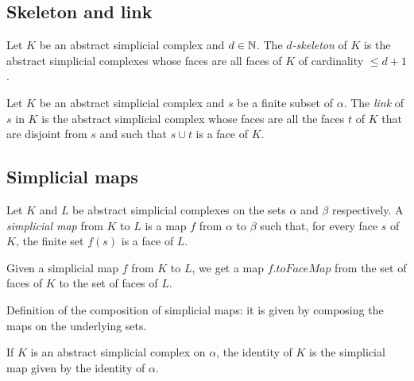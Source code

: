 \subsection{Skeleton and link}

\begin{subdefi}[skeleton]
Let $K$ be an abstract simplicial complex and $d\in\mathbb{N}$. The \emph{$d$-skeleton} of $K$ is the abstract simplicial complexes whose faces are
all faces of $K$ of cardinality $\leq d+1$.

\end{subdefi}

\begin{subdefi}[link]
Let $K$ be an abstract simplicial complex and $s$ be a finite subset of $\alpha$. The \emph{link} of $s$ in $K$ is the abstract simplicial complex
whose faces are all the faces $t$ of $K$ that are disjoint from $s$ and such that $s\cup t$ is a face of $K$.

\end{subdefi}


\subsection{Simplicial maps}

\begin{subdefi}[SimplicialMap]
Let $K$ and $L$ be abstract simplicial complexes on the sets $\alpha$ and $\beta$ respectively. A \emph{simplicial map} from $K$ to $L$ is a map
$f$ from $\alpha$ to $\beta$ such that, for every face $s$ of $K$, the finite set $f(s)$ is a face of $L$.

\end{subdefi}

\begin{subdefi}[toFaceMap]
Given a simplicial map $f$ from $K$ to $L$, we get a map $f.toFaceMap$ from the set of faces of $K$ to the set of faces of $L$.

\end{subdefi}

\begin{subdefi}[comp]
Definition of the composition of simplicial maps: it is given by composing the maps on the underlying sets.

\end{subdefi}

\begin{subdefi}[id]
If $K$ is an abstract simplicial complex on $\alpha$, the identity of $K$ is the simplicial map given by the identity of $\alpha$.

\end{subdefi}

